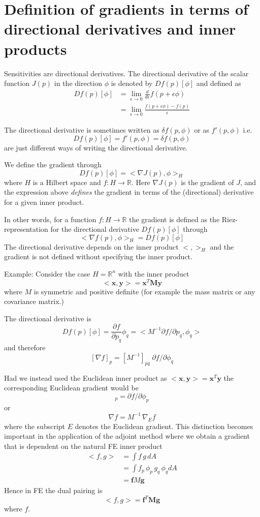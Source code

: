 \documentclass[10pt,a4paper]{book}
\newcommand{\p}{\partial}
\begin{document}
\chapter{Definition of gradients in terms of directional derivatives and inner products}

Sensitivities are directional derivatives. The directional derivative
of the scalar function $J(p)$ in the direction $\phi$
is denoted by $D f(p)[\phi]$ and defined as
\begin{align*}
 D f(p)[\phi] &= \lim_{\epsilon \to 0} \frac{d}{d \epsilon} f(p+\epsilon \phi)  \\
               &= \lim_{\epsilon \to 0}  \frac{f(p+\epsilon \phi)-f(p)}{\epsilon}
\end{align*}

The directional derivative is sometimes written as $\delta f(p,\phi)$
or as $f'(p,\phi)$ i.e.
\[
D f(p)[\phi]=f'(p,\phi)=\delta f(p,\phi)
\]
are just different ways of writing the directional derivative.

We define the gradient through 
\[
 D f(p)[\phi]  = < \nabla J(p), \phi >_H
\]
where $H$ is a Hilbert space and $f: H \to \mathbb{R}$. 
Here $\nabla J(p)$ is the gradient of $J$, and the expression above
{\em defines} the gradient in terms of the (directional) derivative
for a given inner product.

In other words, for a function $f:H \to \mathbb{R}$ the gradient is
defined as the Riez-representation for the directional derivative
$D f(p)[\phi]$ through
\[
< \nabla f (p) , \phi>_H= D f(p)[\phi] 
\]
The directional derivative depends on the inner product $< , >_H$ and
the gradient is not defined without specifying the inner product.

Example: Consider the case $H=\mathbb{R}^n$ with the inner product 
\[
<\bm{x},\bm{y}> = \bm{x}^T \bm{M} \bm{y}
\]
where $M$ is symmetric and positive definite (for example the mass
matrix or any covariance matrix.)

The directional derivative is
\[
D f(p)[\phi]=\frac{\p f}{\p p_q} \phi_q = < M^{-1} \p f / \p p_q, \phi_q> 
\]
and therefore 
\[
 [\nabla f]_p = [ M^{-1}]_{pq} \; \p f /\p \phi_q  
\] 

Had we instead used the Euclidean inner product as $<\bm{x},\bm{y}> = \bm{x}^T
\bm{y}$
the corresponding Euclidean gradient would be 
\begin{equation}
 [\nabla_E f ]_p = \p f /\p \phi_p  
\end{equation}
or
\begin{equation}
 \nabla f  = M^{-1} \, \nabla_{E} f
\label{eq:Mnablaf}
\end{equation}
where the subscript $E$ denotes the Euclidean gradient. This
distinction becomes important in the application of the adjoint method
where we obtain a gradient that is dependent on the natural FE inner
product 
\begin{align*}
< f , g> &= \int f \, g \, dA \\
         &=\int f_p \, \phi_p  \, g_q \, \phi_q  dA\\
         &= \bm{f} M \bm{g} 
\end{align*}
Hence in FE the dual pairing is 
\[
< f , g > = \bm{f}^T \bm{M} \bm{g}
\]
where $f$.
\end{document}
